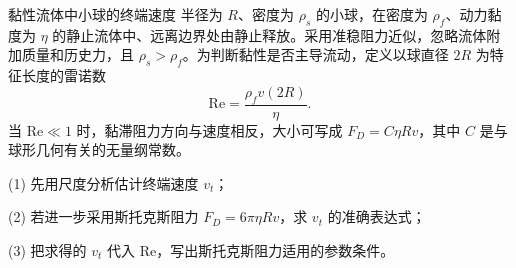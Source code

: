 \begin{origexamplebox}{黏性流体中小球的终端速度}
半径为 $R$、密度为 $\rho_s$ 的小球，在密度为 $\rho_f$、动力黏度为 $\eta$ 的静止流体中、远离边界处由静止释放。采用准稳阻力近似，忽略流体附加质量和历史力，且 $\rho_s>\rho_f$。为判断黏性是否主导流动，定义以球直径 $2R$ 为特征长度的雷诺数
\[
 \mathrm{Re}=\frac{\rho_fv(2R)}{\eta}.
\]
当 $\mathrm{Re}\ll1$ 时，黏滞阻力方向与速度相反，大小可写成 $F_D=C\eta Rv$，其中 $C$ 是与球形几何有关的无量纲常数。

(1) 先用尺度分析估计终端速度 $v_t$；

(2) 若进一步采用斯托克斯阻力 $F_D=6\pi\eta Rv$，求 $v_t$ 的准确表达式；

(3) 把求得的 $v_t$ 代入 $\mathrm{Re}$，写出斯托克斯阻力适用的参数条件。

\end{origexamplebox}
